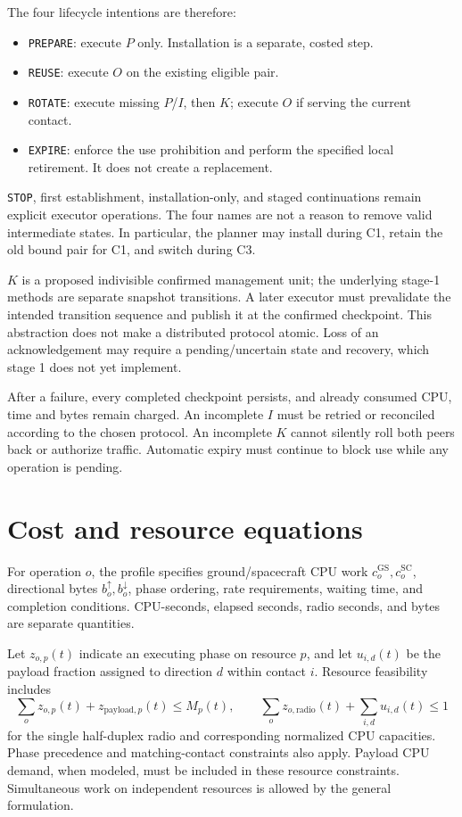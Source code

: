 \documentclass[11pt,a4paper]{article}
\newcommand{\act}[1]{\texttt{#1}}
\newcommand{\SC}{\mathrm{SC}}
\newcommand{\GS}{\mathrm{GS}}
\begin{document}
The four lifecycle intentions are therefore:
\begin{itemize}
\item \act{PREPARE}: execute $P$ only. Installation is a separate, costed step.
\item \act{REUSE}: execute $O$ on the existing eligible pair.
\item \act{ROTATE}: execute missing $P$/$I$, then $K$; execute $O$ if serving the current contact.
\item \act{EXPIRE}: enforce the use prohibition and perform the specified local retirement. It does not create a replacement.
\end{itemize}
\act{STOP}, first establishment, installation-only, and staged continuations remain explicit executor operations. The four names are not a reason to remove valid intermediate states. In particular, the planner may install during C1, retain the old bound pair for C1, and switch during C3.

$K$ is a proposed indivisible confirmed management unit; the underlying stage-1 methods are separate snapshot transitions. A later executor must prevalidate the intended transition sequence and publish it at the confirmed checkpoint. This abstraction does not make a distributed protocol atomic. Loss of an acknowledgement may require a pending/uncertain state and recovery, which stage 1 does not yet implement.

After a failure, every completed checkpoint persists, and already consumed CPU, time and bytes remain charged. An incomplete $I$ must be retried or reconciled according to the chosen protocol. An incomplete $K$ cannot silently roll both peers back or authorize traffic. Automatic expiry must continue to block use while any operation is pending.

\section{Cost and resource equations}
For operation $o$, the profile specifies ground/spacecraft CPU work $c_o^\GS,c_o^\SC$, directional bytes $b_o^\uparrow,b_o^\downarrow$, phase ordering, rate requirements, waiting time, and completion conditions. CPU-seconds, elapsed seconds, radio seconds, and bytes are separate quantities.

Let $z_{o,p}(t)$ indicate an executing phase on resource $p$, and let $u_{i,d}(t)$ be the payload fraction assigned to direction $d$ within contact $i$. Resource feasibility includes
\[
 \sum_o z_{o,p}(t)+z_{\mathrm{payload},p}(t)\leq M_p(t),
 \qquad
 \sum_o z_{o,\mathrm{radio}}(t)+\sum_{i,d}u_{i,d}(t)\leq1
\]
for the single half-duplex radio and corresponding normalized CPU capacities. Phase precedence and matching-contact constraints also apply. Payload CPU demand, when modeled, must be included in these resource constraints. Simultaneous work on independent resources is allowed by the general formulation.
\end{document}
